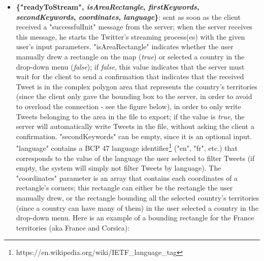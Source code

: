 \documentclass[a4paper,11pt]{report}
\begin{document}
\begin{itemize}
	\item \textbf{\{"readyToStream", \textit{isAreaRectangle}, \textit{firstKeywords}, \textit{secondKeywords}, \textit{coordinates}, \textit{language}\}}: sent as soon as the client received a "successfulInit" message from the server; when the server receives this message, he starts the Twitter's streaming process(es) with the given user's input parameters. "isAreaRectangle" indicates whether the user manually drew a rectangle on the map (\emph{true}) or selected a country in the drop-down menu (\emph{false}); if \emph{false}, this value indicates that the server must wait for the client to send a confirmation that indicates that the received Tweet is in the complex polygon area that represents the country's territories (since the client only gave the bounding box to the server, in order to avoid to overload the connection - see the figure below), in order to only write Tweets belonging to the area in the file to export; if the value is \emph{true}, the server will automatically write Tweets in the file, without asking the client a confirmation. "secondKeywords" can be empty, since it is an optional input. "language" contains a BCP 47 language identifier\footnote{https://en.wikipedia.org/wiki/IETF\_language\_tag} ("en", "fr", etc.) that corresponds to the value of the language the user selected to filter Tweets (if empty, the system will simply not filter Tweets by language).	The "coordinates" parameter is an array that contains each coordinates of a rectangle's corners; this rectangle can either be the rectangle the user manually drew, or the rectangle bounding all the selected country's territories (since a country can have many of them) in the user selected a country in the drop-down menu. Here is an example of a bounding rectangle for the France territories (aka France and Corsica):
	\begin{figure}[H]
	\vspace{-5pt}
	\begin{center}

\end{center}
\end{figure}
\end{itemize}
\end{document}
